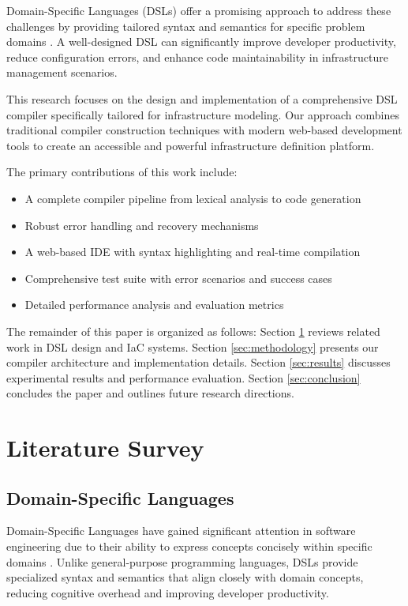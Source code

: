 \documentclass[journal,twocolumn,10pt]{IEEEtran}
\begin{document}
Domain-Specific Languages (DSLs) offer a promising approach to address these challenges by providing tailored syntax and semantics for specific problem domains \cite{dsl_fundamentals}. A well-designed DSL can significantly improve developer productivity, reduce configuration errors, and enhance code maintainability in infrastructure management scenarios.

This research focuses on the design and implementation of a comprehensive DSL compiler specifically tailored for infrastructure modeling. Our approach combines traditional compiler construction techniques with modern web-based development tools to create an accessible and powerful infrastructure definition platform.

The primary contributions of this work include:
\begin{itemize}
    \item A complete compiler pipeline from lexical analysis to code generation
    \item Robust error handling and recovery mechanisms
    \item A web-based IDE with syntax highlighting and real-time compilation
    \item Comprehensive test suite with error scenarios and success cases
    \item Detailed performance analysis and evaluation metrics
\end{itemize}

The remainder of this paper is organized as follows: Section \ref{sec:literature} reviews related work in DSL design and IaC systems. Section \ref{sec:methodology} presents our compiler architecture and implementation details. Section \ref{sec:results} discusses experimental results and performance evaluation. Section \ref{sec:conclusion} concludes the paper and outlines future research directions.

\section{Literature Survey}
\label{sec:literature}

\subsection{Domain-Specific Languages}

Domain-Specific Languages have gained significant attention in software engineering due to their ability to express concepts concisely within specific domains \cite{mernik_2005}. Unlike general-purpose programming languages, DSLs provide specialized syntax and semantics that align closely with domain concepts, reducing cognitive overhead and improving developer productivity.
\end{document}
